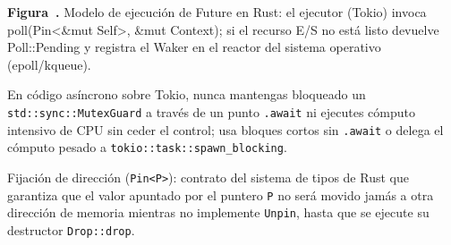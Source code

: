 \documentclass{book}
\newcounter{studiumfigure}
\begin{document}
\begin{minipage}{\linewidth}
%
\fi
\fi
\endgroup
\par\nopagebreak
{\small {}\label{fig:fig-rust-async-poll-state-machine}\textbf{Figura~\thestudiumfigure.} Modelo de ejecución de Future en Rust: el ejecutor (Tokio) invoca poll(Pin<\&mut Self>, \&mut Context); si el recurso E/S no está listo devuelve Poll::Pending y registra el Waker en el reactor del sistema operativo (epoll/kqueue).\par}
\end{minipage}
\par\vspace{\baselineskip}

\begin{tcolorbox}[title={Consejo}, studiumtip, breakable]

En código asíncrono sobre Tokio, nunca mantengas bloqueado un \texttt{std::sync::MutexGuard} a través de un punto \texttt{.await} ni ejecutes cómputo intensivo de CPU sin ceder el control; usa bloques cortos sin \texttt{.await} o delega el cómputo pesado a \texttt{tokio::task::spawn\_blocking}.
\end{tcolorbox}

\begin{tcolorbox}[title={Definición}, studiumdef, breakable]

Fijación de dirección (\texttt{Pin<P>}): contrato del sistema de tipos de Rust que garantiza que el valor apuntado por el puntero \texttt{P} no será movido jamás a otra dirección de memoria mientras no implemente \texttt{Unpin}, hasta que se ejecute su destructor \texttt{Drop::drop}.
\end{tcolorbox}
\end{document}
